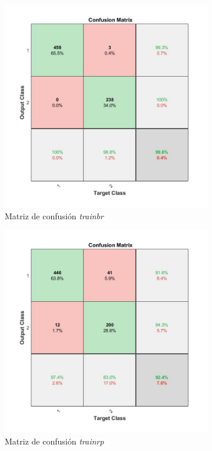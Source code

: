 \documentclass{article}
\begin{document}
\begin{figure}[H]
 \centering
 \begin{subfigure}{0.4\textwidth}
  \includegraphics[width=0.8\linewidth]{../images/I_ex4_confusion_cancer_dataset_trainbr.jpg}
  \caption{Matriz de confusión \textit{trainbr}}
 \end{subfigure}
 \begin{subfigure}{0.4\textwidth}
  \includegraphics[width=0.8\linewidth]{../images/I_ex4_confusion_cancer_dataset_traingd.jpg}
  \caption{Matriz de confusión \textit{trainrp}}
 \end{subfigure}
 \begin{subfigure}{0.4\textwidth}

\end{subfigure}
\end{figure}
\end{document}

